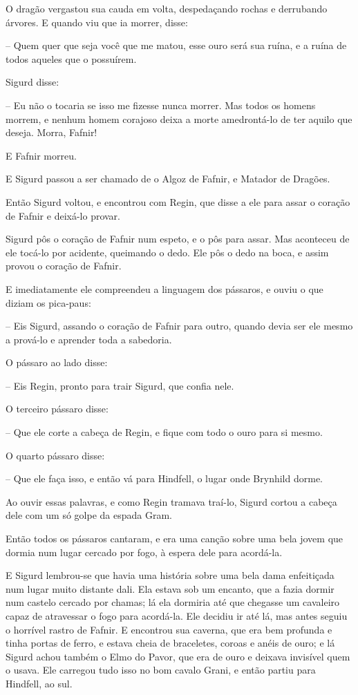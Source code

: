 O dragão vergastou sua cauda em volta, despedaçando rochas e
derrubando árvores. E quando viu que ia morrer, disse:

-- Quem quer que seja você que me matou, esse ouro será sua ruína, e a
ruína de todos aqueles que o possuírem. 

Sigurd disse:

-- Eu não o tocaria se isso me fizesse nunca morrer. Mas todos os
homens morrem, e nenhum homem corajoso deixa a morte amedrontá-lo de
ter aquilo que deseja. Morra, Fafnir! 

E Fafnir morreu. 

E Sigurd passou a ser chamado de o Algoz de Fafnir, e Matador de
Dragões. 

Então Sigurd voltou, e encontrou com Regin, que disse a ele para assar
o coração de Fafnir e deixá-lo provar. 

Sigurd pôs o coração de Fafnir num espeto, e o pôs para assar. Mas
aconteceu de ele tocá-lo por acidente, queimando o dedo. Ele pôs o
dedo na boca, e assim provou o coração de Fafnir. 

E imediatamente ele compreendeu a linguagem dos pássaros, e ouviu o
que diziam os pica-paus:

-- Eis Sigurd, assando o coração de Fafnir para outro, quando devia ser
ele mesmo a prová-lo e aprender toda a sabedoria. 

O pássaro ao lado disse:

-- Eis Regin, pronto para trair Sigurd, que confia nele. 

O terceiro pássaro disse:

-- Que ele corte a cabeça de Regin, e fique com todo o ouro para si
mesmo.

O quarto pássaro disse:

-- Que ele faça isso, e então vá para Hindfell, o lugar onde Brynhild
dorme. 

Ao ouvir essas palavras, e como Regin tramava traí-lo, Sigurd cortou a
cabeça dele com um só golpe da espada Gram.

Então todos os pássaros cantaram, e era uma canção sobre uma bela
jovem que dormia num lugar cercado por fogo, à espera dele para
acordá-la. 

E Sigurd lembrou-se que havia uma história sobre uma bela dama
enfeitiçada num lugar muito distante dali. Ela estava sob um encanto,
que a fazia dormir num castelo cercado por chamas; lá ela dormiria
até que chegasse um cavaleiro capaz de atravessar o fogo para
acordá-la. Ele decidiu ir até lá, mas antes seguiu o horrível rastro
de Fafnir. E encontrou sua caverna, que era bem profunda e tinha
portas de ferro, e estava cheia de braceletes, coroas e anéis de
ouro; e lá Sigurd achou também o Elmo do Pavor, que era de ouro e
deixava invisível quem o usava. Ele carregou tudo isso no bom cavalo
Grani, e então partiu para Hindfell, ao sul. 

